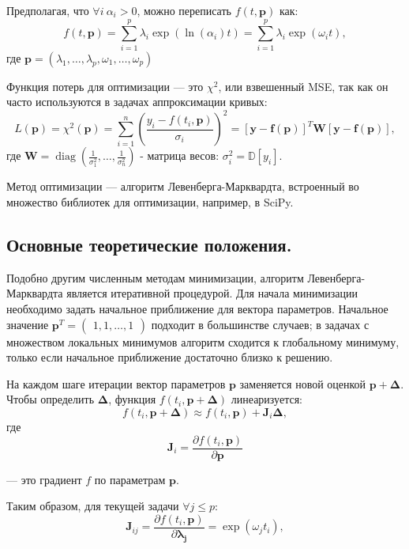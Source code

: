 Предполагая, что $\forall i \:\alpha_i > 0$, можно переписать $f(t, \textbf{p})$ как:
$$
	f(t, \textbf{p})=\sum_{i=1}^p\lambda_i\exp(\ln(\alpha_i)t) =
	\sum_{i=1}^p\lambda_i\exp(\omega_it),
$$
где $\textbf{p} = (\lambda_1, \ldots, \lambda_p, \omega_1, \ldots, \omega_p)$

Функция потерь для оптимизации — это $\chi^2$, или взвешенный MSE, так как он часто используются в задачах аппроксимации кривых:
$$
	L(\mathbf{p}) = \chi^2(\boldsymbol p) = \sum_{i=1}^n\left(\frac{y_i-f(t_i, \boldsymbol p)}{\sigma_i}\right)^2 = \left[\mathbf y - \mathbf f\left ( \mathbf{p}\right )\right ]^T\boldsymbol{W}\left[\mathbf y - \mathbf f\left ( \mathbf{p}\right )\right ],
$$
где $\boldsymbol{W} = \operatorname{diag}\left(\frac{1}{\sigma_1^2}, \ldots, \frac{1}{\sigma_n^2}\right)$ - матрица весов: $\sigma_i^2=\mathbb{D}[y_i]$.

Метод оптимизации — алгоритм Левенберга-Марквардта, встроенный во множество библиотек для оптимизации, например, в SciPy.

\subsection*{Основные теоретические положения.}

Подобно другим численным методам минимизации, алгоритм Левенберга-Марквардта является итеративной процедурой. Для начала минимизации необходимо задать начальное приближение для вектора параметров. Начальное значение $\textbf{p}^T=\begin{pmatrix}1, 1, \dots, 1\end{pmatrix}$ подходит в большинстве случаев; в задачах с множеством локальных минимумов алгоритм сходится к глобальному минимуму, только если начальное приближение достаточно близко к решению.

На каждом шаге итерации вектор параметров $\textbf{p}$ заменяется новой оценкой $\textbf{p}+\boldsymbol{\Delta}$. Чтобы определить $\boldsymbol{\Delta}$, функция $f(t_i, \textbf{p} + \boldsymbol{\Delta})$ линеаризуется:
$$
	f(t_i, \textbf{p} + \boldsymbol{\Delta})\approx f(t_i, \textbf{p})+\mathbf{J}_i\boldsymbol{\Delta},
$$
где
\[
	\mathbf{J}_i = \frac{\partial f\left (t_i,  \mathbf{p}\right )}{\partial  \mathbf{p}}
\]

— это градиент $f$ по параметрам $\mathbf{p}$.

Таким образом, для текущей задачи $\forall j\le p:$
$$
	\mathbf{J}_{ij}=\frac{\partial f\left (t_i,  \mathbf{p}\right )}{\partial  \mathbf{\lambda_j}} = \exp(\omega_jt_i),
$$

